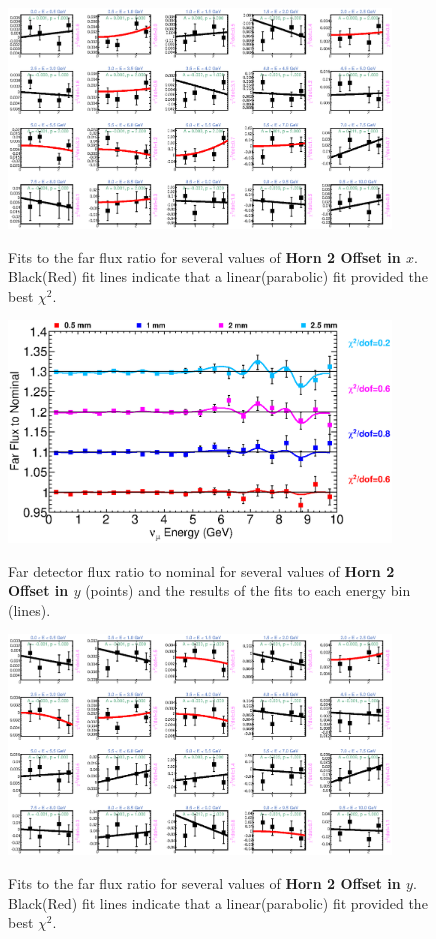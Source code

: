 \begin{figure}[hb]
  \begin{center}
    {\includegraphics[width=4.0in]{figures/Horn2XOffset_far_fits.eps}}
  \end{center}
\caption{ Fits to the far flux ratio for several values of {\bf Horn 2 Offset in $x$}. Black(Red) fit lines indicate that a linear(parabolic) fit provided the best $\chi^2$. }
\end{figure}

\begin{figure}[ht]
  \begin{center}
    {\includegraphics[width=4.0in]{figures/Horn2YOffset_far_summary.eps}}
  \end{center}
\caption{ Far detector flux ratio to nominal for several values of {\bf Horn 2 Offset in $y$} (points) and the results of the fits to each energy bin (lines).}
\end{figure}

\begin{figure}[hb]
  \begin{center}
    {\includegraphics[width=4.0in]{figures/Horn2YOffset_far_fits.eps}}
  \end{center}
\caption{ Fits to the far flux ratio for several values of {\bf Horn 2 Offset in $y$}. Black(Red) fit lines indicate that a linear(parabolic) fit provided the best $\chi^2$. }
\end{figure}



